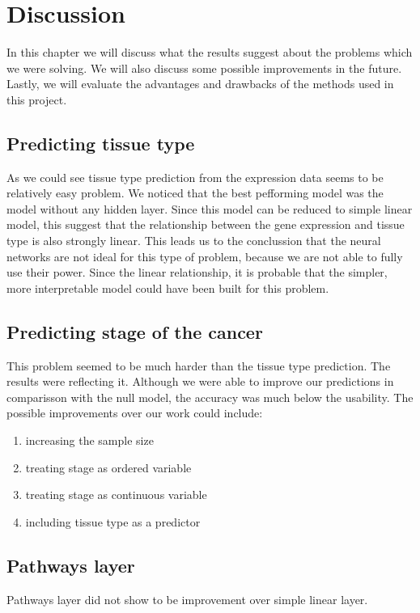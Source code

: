 \chapter{Discussion}
In this chapter we will discuss what the results suggest about the problems which we were solving.
We will also discuss some possible improvements in the future.
Lastly, we will evaluate the advantages and drawbacks of the methods used in this project.


\section{Predicting tissue type}
As we could see tissue type prediction from the expression data seems to be relatively easy problem.
We noticed that the best pefforming model was the model without any hidden layer.
Since this model can be reduced to simple linear model, this suggest that the relationship between the gene expression and tissue type is also strongly linear.
This leads us to the conclussion that the neural networks are not ideal for this type of problem, because we are not able to fully use their power.
Since the linear relationship, it is probable that the simpler, more interpretable model could have been built for this problem.

\section{Predicting stage of the cancer}
This problem seemed to be much harder than the tissue type prediction.
The results were reflecting it.
Although we were able to improve our predictions in comparisson with the null model, the accuracy was much below the usability.
The possible improvements over our work could include:
\begin{enumerate}
    \item increasing the sample size
    \item treating stage as ordered variable
    \item treating stage as continuous variable
    \item including tissue type as a predictor
\end{enumerate} 

\section{Pathways layer}
Pathways layer did not show to be improvement over simple linear layer.